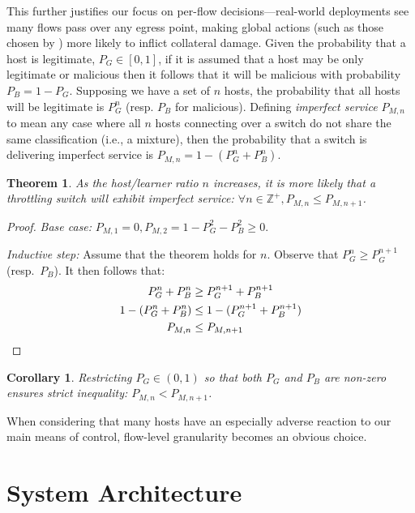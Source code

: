 \documentclass[10pt, times, conference, letterpaper]{IEEEtran}
\newtheorem{thm}{Theorem}
\newtheorem{corr}{Corollary}[thm]
\begin{document}
This further justifies our focus on per-flow decisions---real-world deployments see many flows pass over any egress point, making global actions (such as those chosen by \textcite{DBLP:journals/eaai/MalialisK15}) more likely to inflict collateral damage.
Given the probability that a host is legitimate, $P_G \in [0,1]$,  if it is assumed that a host may be only legitimate or malicious then it follows that it will be malicious with probability $P_B = 1 - P_G$.
Supposing we have a set of $n$ hosts, the probability that all hosts will be legitimate is $P_G^n$ (resp. $P_B$ for malicious).
Defining \emph{imperfect service} $P_{M,n}$ to mean any case where all $n$ hosts connecting over a switch do not share the same classification (i.e., a mixture), then the probability that a switch is delivering imperfect service is $P_{M,n} = 1 - (P_G^n + P_B^n)$.
\begin{thm}
	As the host/learner ratio $n$ increases, it is more likely that a throttling switch will exhibit imperfect service: $\forall n \in \mathbb{Z}^{+}, P_{M,n} \le P_{M,n+1}$.
\end{thm}
\begin{proof}
	\emph{Base case:} $P_{M,1}=0, P_{M,2} = 1 - P_G^2 - P_B^2 \ge 0$.
	
	\emph{Inductive step:} Assume that the theorem holds for $n$. Observe that $P_G^n \ge P_G^{n+1}$ (resp.\ $P_B$). It then follows that:
	\begin{align*}
	P_G^n + P_B^n &\ge P_G^{n+1} + P_B^{n+1}\\
	1 - (P_G^n + P_B^n) &\le 1 - (P_G^{n+1} + P_B^{n+1})\\
	P_{M,n} &\le P_{M,n+1} \qedhere
	\end{align*}
\end{proof}
\begin{corr}
	Restricting $P_G \in (0,1)$ so that both $P_G$ and $P_B$ are non-zero ensures strict inequality: $P_{M,n} < P_{M,n+1}$.
\end{corr}
When considering that many hosts have an especially adverse reaction to our main means of control, flow-level granularity becomes an obvious choice.

\section{System Architecture}\label{sec:system-architecture}
\end{document}
